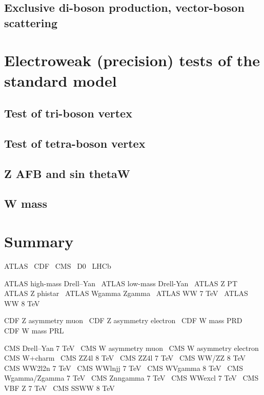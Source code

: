 \documentclass[12pt]{iopart}
\begin{document}
\subsection{Exclusive di-boson production, vector-boson scattering}


\section{Electroweak (precision) tests of the standard model}
\subsection{Test of tri-boson vertex}
\subsection{Test of tetra-boson vertex}
\subsection{Z AFB and sin thetaW}
\subsection{W mass}


\section{Summary}
ATLAS~\cite{Aad:2008zzm}
CDF~\cite{Abulencia:2005ix}
CMS~\cite{CMSdetector}
D0~\cite{Abazov:2005pn}
LHCb~\cite{Alves:2008zz}

ATLAS high-mass Drell--Yan~\cite{Aad:2013iua} 
ATLAS low-mass Drell-Yan~\cite{Aad:2014qja}
ATLAS Z PT~\cite{Aad:2014xaa}
ATLAS Z phistar~\cite{Aad:2012wfa}
ATLAS Wgamma Zgamma~\cite{Aad:2013izg}
ATLAS WW 7 TeV~\cite{ATLAS:2012mec}
ATLAS WW 8 TeV~\cite{ATLAS-CONF-2014-033}

CDF Z asymmetry muon~\cite{Aaltonen:2014loa}
CDF Z asymmetry electron~\cite{Aaltonen:2013wcp}
CDF W mass PRD~\cite{Aaltonen:2013vwa}
CDF W mass PRL~\cite{Aaltonen:2012bp}

CMS Drell--Yan 7 TeV~\cite{Chatrchyan:2013tia}
CMS W asymmetry muon~\cite{Chatrchyan:2013mza}
CMS W asymmetry electron~\cite{Chatrchyan:2012xt}
CMS W+charm~\cite{Chatrchyan:2013uja}
CMS ZZ4l 8 TeV~\cite{Khachatryan:2014dia}
CMS ZZ4l 7 TeV~\cite{Chatrchyan:2012sga}
CMS WW/ZZ 8 TeV~\cite{Chatrchyan:2013oev}
CMS WW2l2n 7 TeV~\cite{Chatrchyan:2013yaa}
CMS WWlnjj 7 TeV~\cite{Chatrchyan:2012bd}
CMS WVgamma 8 TeV~\cite{Chatrchyan:2014bza}
CMS Wgamma/Zgamma 7 TeV~\cite{Chatrchyan:2013fya}
CMS Znngamma 7 TeV~\cite{Chatrchyan:2013nda}
CMS WWexcl 7 TeV~\cite{Chatrchyan:2013foa}
CMS VBF Z 7 TeV~\cite{Chatrchyan:2013jya}
CMS SSWW 8 TeV~\cite{CMS-PAS-SMP-13-015}
\end{document}
